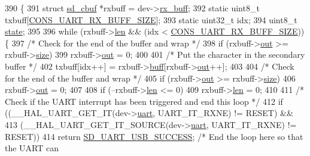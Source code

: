 \begin{DoxyCode}
390 \{
391     \textcolor{keyword}{struct }\mbox{\hyperlink{structsd__cbuf}{sd\_cbuf}} *rxbuff = dev->\mbox{\hyperlink{structsd__uart__dev_a2bc17c33f4234299b83ba5d98edd5887}{rx\_buff}};
392     \textcolor{keyword}{static} uint8\_t txbuff[\mbox{\hyperlink{group___s_d___platform___defines_gaf42bf8bfc63a6cca851012eeb8e25b52}{CONS\_UART\_RX\_BUFF\_SIZE}}];
393     \textcolor{keyword}{static} uint32\_t idx;
394     uint8\_t \mbox{\hyperlink{structsd__cbuf_aa88ff4ca3b7aaba9e9aaa27fd9ea94a9}{state}};
395 
396     \textcolor{keywordflow}{while} (rxbuff->\mbox{\hyperlink{structsd__cbuf_a96bbf959016e4411c9e6b9812a8be60a}{len}} && (idx < \mbox{\hyperlink{group___s_d___platform___defines_gaf42bf8bfc63a6cca851012eeb8e25b52}{CONS\_UART\_RX\_BUFF\_SIZE}})) \{
397         \textcolor{comment}{/* Check for the end of the buffer and wrap */}
398         \textcolor{keywordflow}{if} (rxbuff->\mbox{\hyperlink{structsd__cbuf_ab27775f0ed2b042b439a7431fbe311eb}{out}} >= rxbuff->\mbox{\hyperlink{structsd__cbuf_ab2c6b258f02add8fdf4cfc7c371dd772}{size}})
399             rxbuff->\mbox{\hyperlink{structsd__cbuf_ab27775f0ed2b042b439a7431fbe311eb}{out}} = 0;
400     
401         \textcolor{comment}{/* Put the character in the secondary buffer */}
402         txbuff[idx++] = rxbuff->\mbox{\hyperlink{structsd__cbuf_a8b212742c92a124f2eb4a244acc19f7c}{buff}}[rxbuff->\mbox{\hyperlink{structsd__cbuf_ab27775f0ed2b042b439a7431fbe311eb}{out}}++];
403     
404         \textcolor{comment}{/* Check for the end of the buffer and wrap */}
405         \textcolor{keywordflow}{if} (rxbuff->\mbox{\hyperlink{structsd__cbuf_ab27775f0ed2b042b439a7431fbe311eb}{out}} >= rxbuff->\mbox{\hyperlink{structsd__cbuf_ab2c6b258f02add8fdf4cfc7c371dd772}{size}})
406             rxbuff->\mbox{\hyperlink{structsd__cbuf_ab27775f0ed2b042b439a7431fbe311eb}{out}} = 0;
407     
408         \textcolor{keywordflow}{if} (--rxbuff->\mbox{\hyperlink{structsd__cbuf_a96bbf959016e4411c9e6b9812a8be60a}{len}} <= 0)
409             rxbuff->\mbox{\hyperlink{structsd__cbuf_a96bbf959016e4411c9e6b9812a8be60a}{len}} = 0;
410     
411         \textcolor{comment}{/* Check if the UART interrupt has been triggered and end this loop */}
412         \textcolor{keywordflow}{if} ((\_\_HAL\_UART\_GET\_IT(dev->\mbox{\hyperlink{structsd__uart__dev_a31b2a452cffe839ac4a3bf86eddc16b0}{uart}}, UART\_IT\_RXNE) != RESET) && 
413             (\_\_HAL\_UART\_GET\_IT\_SOURCE(dev->\mbox{\hyperlink{structsd__uart__dev_a31b2a452cffe839ac4a3bf86eddc16b0}{uart}}, UART\_IT\_RXNE) != RESET))
414             \textcolor{keywordflow}{return} \mbox{\hyperlink{group___s_d___u_a_r_t___u_s_b___bridge___types_gga7e4773a8cce69fafe541cad55985f146a5f1ee74f25f6a6f1aa6b771dc91abe11}{SD\_UART\_USB\_SUCCESS}};  \textcolor{comment}{/* End the loop here so that the UART can
}
\end{DoxyCode}

